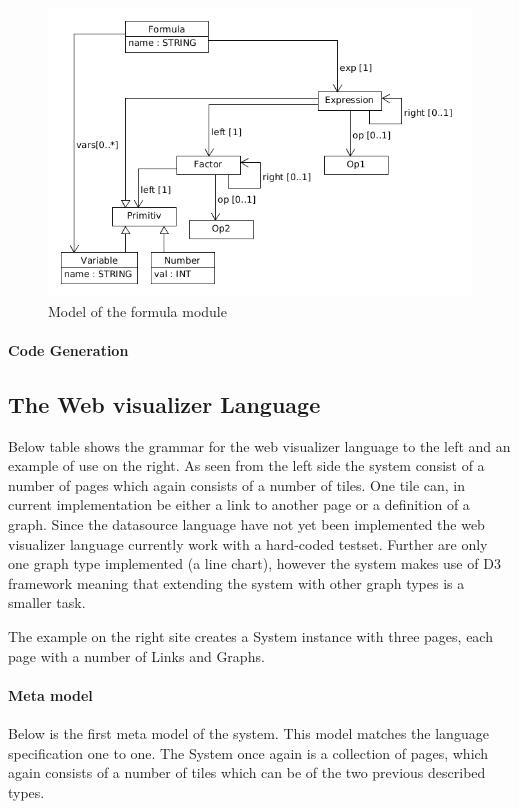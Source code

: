 \begin{figure}
  \begin{center}
  \includegraphics[width=\linewidth]{images/MetaFormula}
  \end{center}
  \caption{Model of the formula module}
  \label{fig:formulaModel}
\end{figure}
\paragraph{Code Generation}

\subsection{The Web visualizer Language}
Below table shows the grammar for the web visualizer language to the left and an example of use on the right. 
As seen from the left side the system consist of a number of pages which again consists of a number of tiles. 
One tile can, in current implementation be either a link to another page or a definition of a graph. 
Since the datasource language have not yet been implemented the web visualizer language currently work with a hard-coded testset. 
Further are only one graph type implemented (a line chart), however the system makes use of D3 framework meaning that extending the system with other graph types is a smaller task.


The example on the right site creates a System instance with three pages, each page with a number of Links and Graphs.

\paragraph{Meta model}
Below is the first meta model of the system. 
This model matches the language specification one to one. 
The System once again is a collection of pages, which again consists of a number of tiles which can be of the two previous described types. 

